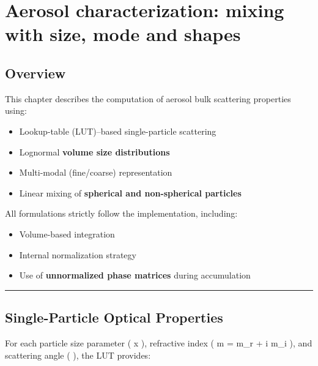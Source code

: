 \documentclass[
  letterpaper,
]{scrbook}
\providecommand{\tightlist}{%
  \setlength{\itemsep}{0pt}\setlength{\parskip}{0pt}}
\begin{document}
\chapter{Aerosol characterization: mixing with size, mode and
shapes}\label{aerosol-characterization-mixing-with-size-mode-and-shapes}

\section{Overview}\label{overview-4}

This chapter describes the computation of aerosol bulk scattering
properties using:

\begin{itemize}
\tightlist
\item
  Lookup-table (LUT)--based single-particle scattering\\
\item
  Lognormal \textbf{volume size distributions}\\
\item
  Multi-modal (fine/coarse) representation\\
\item
  Linear mixing of \textbf{spherical and non-spherical particles}
\end{itemize}

All formulations strictly follow the implementation, including:

\begin{itemize}
\tightlist
\item
  Volume-based integration\\
\item
  Internal normalization strategy\\
\item
  Use of \textbf{unnormalized phase matrices} during accumulation
\end{itemize}

\begin{center}\rule{0.5\linewidth}{0.5pt}\end{center}

\section{Single-Particle Optical
Properties}\label{single-particle-optical-properties}

For each particle size parameter ( x ), refractive index ( m = m\_r + i
m\_i ), and scattering angle ( \theta ), the LUT provides:
\end{document}
